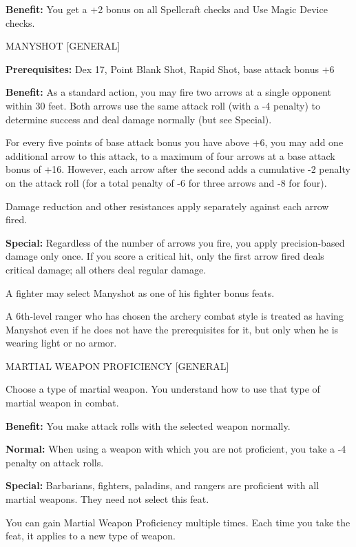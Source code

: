 \documentclass{article}
\begin{document}
\textbf{Benefit:} You get a +2 bonus on all Spellcraft checks and Use Magic Device 
checks.

\vspace{12pt}
MANYSHOT [GENERAL]

\textbf{Prerequisites:} Dex 17, Point Blank Shot, Rapid Shot, base attack bonus 
+6

\textbf{Benefit:} As a standard action, you may fire two arrows at a single opponent 
within 30 feet. Both arrows use the same attack roll (with a -4 penalty) to determine 
success and deal damage normally (but see Special).

For every five points of base attack bonus you have above +6, you may add one additional 
arrow to this attack, to a maximum of four arrows at a base attack bonus of +16. 
However, each arrow after the second adds a cumulative -2 penalty on the attack 
roll (for a total penalty of -6 for three arrows and -8 for four).

Damage reduction and other resistances apply separately against each arrow fired.

\textbf{Special:} Regardless of the number of arrows you fire, you apply precision-based 
damage only once. If you score a critical hit, only the first arrow fired deals 
critical damage; all others deal regular damage.

A fighter may select Manyshot as one of his fighter bonus feats.

A 6th-level ranger who has chosen the archery combat style is treated as having 
Manyshot even if he does not have the prerequisites for it, but only when he is 
wearing light or no armor.

\vspace{12pt}
MARTIAL WEAPON PROFICIENCY [GENERAL]

Choose a type of martial weapon. You understand how to use that type of martial 
weapon in combat.

\textbf{Benefit:} You make attack rolls with the selected weapon normally.

\textbf{Normal:} When using a weapon with which you are not proficient, you take 
a -4 penalty on attack rolls.

\textbf{Special:} Barbarians, fighters, paladins, and rangers are proficient with 
all martial weapons. They need not select this feat.

You can gain Martial Weapon Proficiency multiple times. Each time you take the 
feat, it applies to a new type of weapon. 
\end{document}
